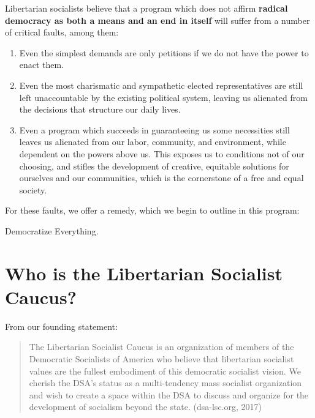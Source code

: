 \documentclass[10pt]{memoir}
\begin{document}
\pagebreak
Libertarian socialists believe that a program which does not affirm \linebreak\textbf{radical democracy as both a means and an end in itself} will suffer from a number of critical faults, among them:
\begin{enumerate}
\item{Even the simplest demands are only petitions if we do not have the power to enact them.}
\item{Even the most charismatic and sympathetic elected representatives are still left unaccountable by the existing political system, leaving us alienated from the decisions that structure our daily lives.}
\item{Even a program which succeeds in guaranteeing us some necessities still leaves us alienated from our labor, community, and environment, while dependent on the powers above us. This exposes us to conditions not of our choosing, and stifles the development of creative, equitable solutions for ourselves and our communities, which is the cornerstone of a free and equal society.}
\end{enumerate}

For these faults, we offer a remedy, which we begin to outline in this program:

Democratize Everything. 

\vfill
\pagebreak
\section*{Who is the Libertarian Socialist Caucus?}
From our founding statement:
\begin{quote}
The Libertarian Socialist Caucus is an organization of members of the Democratic Socialists of America who believe that libertarian socialist values are the fullest embodiment of this democratic socialist vision. We cherish the DSA's status as a multi-tendency mass socialist organization and wish to create a space within the DSA to discuss and organize for the development of socialism beyond the state. (dsa-lsc.org, 2017)
\end{quote}
\end{document}
